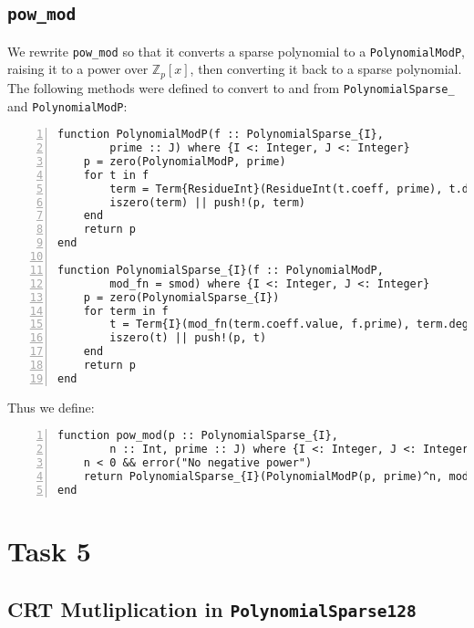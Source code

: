 \documentclass{article}
\theoremstyle{plain}
\numberwithin{theorem}{section}
\numberwithin{example}{section}
\theoremstyle{definition}
\numberwithin{definition}{section}
\begin{document}
\bigbreak

\subsection{\texttt{pow\_mod}}
We rewrite \texttt{pow\_mod} so that it converts a sparse polynomial to a
\texttt{PolynomialModP}, raising it to a power over $\mathbb{Z}_p[x]$, then
converting it back to a sparse polynomial. The following methods were defined to
convert to and from \texttt{PolynomialSparse\_} and
\texttt{PolynomialModP}:

\begin{codebox}
    \begin{Verbatim}[numbers=left,xleftmargin=5mm]
function PolynomialModP(f :: PolynomialSparse_{I},
        prime :: J) where {I <: Integer, J <: Integer}
    p = zero(PolynomialModP, prime)
    for t in f
        term = Term{ResidueInt}(ResidueInt(t.coeff, prime), t.degree)
        iszero(term) || push!(p, term)
    end
    return p
end

function PolynomialSparse_{I}(f :: PolynomialModP,
        mod_fn = smod) where {I <: Integer, J <: Integer}
    p = zero(PolynomialSparse_{I})
    for term in f
        t = Term{I}(mod_fn(term.coeff.value, f.prime), term.degree)
        iszero(t) || push!(p, t)
    end
    return p
end
    \end{Verbatim}
\end{codebox}

Thus we define:

\begin{codebox}
    \begin{Verbatim}[numbers=left,xleftmargin=5mm]
function pow_mod(p :: PolynomialSparse_{I},
        n :: Int, prime :: J) where {I <: Integer, J <: Integer}
    n < 0 && error("No negative power")
    return PolynomialSparse_{I}(PolynomialModP(p, prime)^n, mod)
end
    \end{Verbatim}
\end{codebox}


\bigbreak

\section{Task 5} \label{crt}
\subsection{CRT Mutliplication in \texttt{PolynomialSparse128}}
\end{document}
